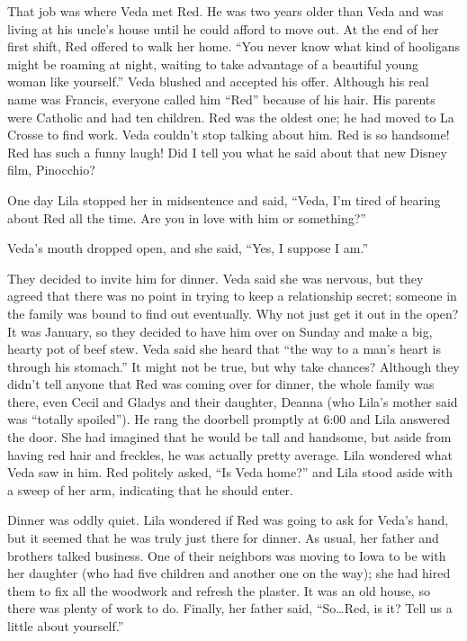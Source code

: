 \documentclass[
  american,
  letterpaper,
]{book}
\begin{document}
That job was where Veda met Red. He was two years older than Veda and
was living at his uncle's house until he could afford to move out. At
the end of her first shift, Red offered to walk her home. ``You never
know what kind of hooligans might be roaming at night, waiting to take
advantage of a beautiful young woman like yourself.'' Veda blushed and
accepted his offer. Although his real name was Francis, everyone called
him ``Red'' because of his hair. His parents were Catholic and had ten
children. Red was the oldest one; he had moved to La Crosse to find
work. Veda couldn't stop talking about him. Red is so handsome! Red has
such a funny laugh! Did I tell you what he said about that new Disney
film, Pinocchio?

One day Lila stopped her in midsentence and said, ``Veda, I'm tired of
hearing about Red all the time. Are you in love with him or something?''

Veda's mouth dropped open, and she said, ``Yes, I suppose I am.''

They decided to invite him for dinner. Veda said she was nervous, but
they agreed that there was no point in trying to keep a relationship
secret; someone in the family was bound to find out eventually. Why not
just get it out in the open? It was January, so they decided to have him
over on Sunday and make a big, hearty pot of beef stew. Veda said she
heard that ``the way to a man's heart is through his stomach.'' It might
not be true, but why take chances? Although they didn't tell anyone that
Red was coming over for dinner, the whole family was there, even Cecil
and Gladys and their daughter, Deanna (who Lila's mother said was
``totally spoiled''). He rang the doorbell promptly at 6:00 and Lila
answered the door. She had imagined that he would be tall and handsome,
but aside from having red hair and freckles, he was actually pretty
average. Lila wondered what Veda saw in him. Red politely asked, ``Is
Veda home?'' and Lila stood aside with a sweep of her arm, indicating
that he should enter.

Dinner was oddly quiet. Lila wondered if Red was going to ask for Veda's
hand, but it seemed that he was truly just there for dinner. As usual,
her father and brothers talked business. One of their neighbors was
moving to Iowa to be with her daughter (who had five children and
another one on the way); she had hired them to fix all the woodwork and
refresh the plaster. It was an old house, so there was plenty of work to
do. Finally, her father said, ``So\ldots Red, is it? Tell us a little
about yourself.''
\end{document}
